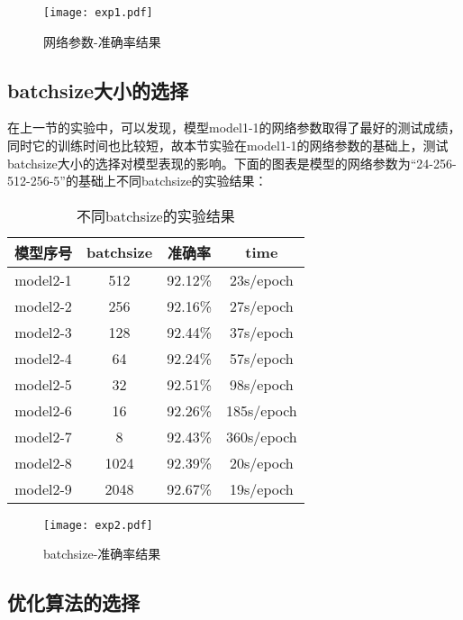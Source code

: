 \begin{figure}[H]
    \centering
    \texttt{[image: exp1.pdf]}
    \caption{网络参数-准确率结果}
    \label{fig:exp1-2}
\end{figure}

\subsection{batchsize大小的选择}

在上一节的实验中，可以发现，模型model1-1的网络参数取得了最好的测试成绩，同时它的训练时间也比较短，故本节实验在model1-1的网络参数的基础上，测试batchsize大小的选择对模型表现的影响。下面的图表是模型的网络参数为“24-256-512-256-5”的基础上不同batchsize的实验结果：
\begin{table}[htbp]
	\centering
	\caption{不同batchsize的实验结果}
	\begin{tabular}{c|c|c|c}
		\toprule
		模型序号 & batchsize & 准确率  & time       \\
		\midrule
		model2-1 & 512       & 92.12\% & 23s/epoch  \\
		\midrule
		model2-2 & 256       & 92.16\% & 27s/epoch  \\
		\midrule
		model2-3 & 128       & 92.44\% & 37s/epoch  \\
		\midrule
		model2-4 & 64        & 92.24\% & 57s/epoch  \\
		\midrule
		model2-5 & 32        & 92.51\% & 98s/epoch  \\
		\midrule
		model2-6 & 16        & 92.26\% & 185s/epoch \\
		\midrule
		model2-7 & 8         & 92.43\% & 360s/epoch \\
		\midrule
		model2-8 & 1024      & 92.39\% & 20s/epoch  \\
		\midrule
		model2-9 & 2048      & 92.67\% & 19s/epoch  \\
		\bottomrule
	\end{tabular}%
	\label{tab:exp2-1}%
\end{table}%

\begin{figure}[H]
    \centering
    \texttt{[image: exp2.pdf]}
    \caption{batchsize-准确率结果}
    \label{fig:exp2-2}
\end{figure}

\subsection{优化算法的选择}

